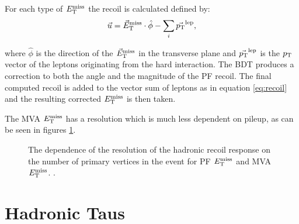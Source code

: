 For each type of $E_{\mathrm{T}}^{\text{miss}}$ the recoil is calculated defined by:
\begin{equation}
\vec{u} = \vec E_\mathrm{T}^\mathrm{miss} \cdot \hat{\phi} - \sum_{i}{ \vec{p_{\mathrm{T}}}^{\text{lep}}} ,
\label{eq:recoil}
\end{equation}

where $\hat{\phi}$ is the direction of the $\vec E_\mathrm{T}^\mathrm{miss}$ in the transverse plane and
$\vec{p_{\mathrm{T}}}^{\text{lep}}$ is the $p_{\mathrm{T}}$ vector of the leptons originating from the
hard interaction. The \ac{BDT} produces a correction to both the angle and the
magnitude of the \ac{PF} recoil. The final computed recoil is added to the
vector sum of leptons as in equation \ref{eq:recoil} and the resulting corrected
$E_{\mathrm{T}}^{\text{miss}}$ is then taken. 

The MVA $E_{\mathrm{T}}^{\text{miss}}$ has a resolution which is much less
dependent on pileup, as can be seen in figures \ref{fig:mvamet}.

\begin{figure}
\begin{center}
\end{center}
\caption{The dependence of the resolution of the hadronic
recoil response on the number of primary vertices in the event for \ac{PF}
$E_{\mathrm{T}}^{\text{miss}}$ and MVA $E_{\mathrm{T}}^{\text{miss}}$.
\cite{CMS-PAS-JME-12-002}.
}
\label{fig:mvamet}
\end{figure}

\section{Hadronic Taus}
\label{sec:taus}

